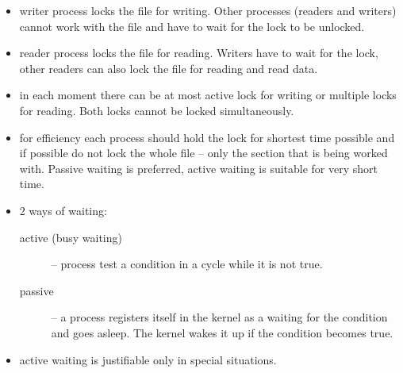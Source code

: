 
\begin{slide}
\begin{itemize}
\item writer process locks the file for writing. Other processes
(readers and writers) cannot work with the file and have to wait for the lock
to be unlocked.
\item reader process locks the file for reading. Writers have to wait
for the lock, other readers can also lock the file for reading and read data.
\item in each moment there can be at most active lock for writing or multiple
locks for reading. Both locks cannot be locked simultaneously.
\item for efficiency each process should hold the lock for shortest time
possible and if possible do not lock the whole file -- only the section that 
is being worked with. Passive waiting is preferred, active waiting is
suitable for very short time.
\end{itemize}
\end{slide}

\begin{itemize}
\item 2 ways of waiting:
\begin{description}
\item[active (busy waiting)] -- process test a condition in a cycle while it
is not true.
\item[passive] -- a process registers itself in the kernel as a waiting for
the condition and goes asleep. The kernel wakes it up if the condition becomes
true.
\end{description}
\item \label{BUSYWAITING} active waiting is justifiable only in special
situations.
\end{itemize}




